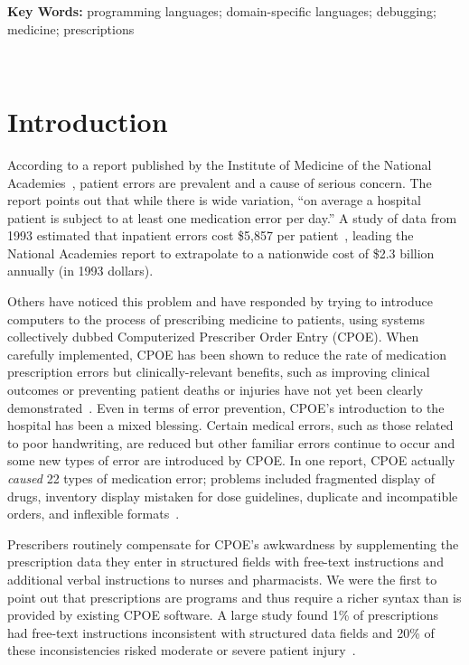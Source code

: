\documentclass[11pt]{article}
\begin{document}
\noindent
\textbf{Key Words:} programming languages; domain-specific languages; debugging; medicine; prescriptions

\newpage

\setlength{\parindent}{0pt}
\setlength{\parskip}{1ex plus 0.5ex minus 0.2ex}

\setcounter{page}{1}
\pagestyle{plain}


~

\section{Introduction}

According to a report published by the Institute of Medicine of the
National Academies~\citep{preventing-medical-errors}, patient errors
are prevalent and a cause of serious concern.
%
The report points out that while there is wide variation, ``on average
a hospital patient is subject to at least one medication error per
day.''
%
A study of data from 1993 estimated that inpatient errors cost \$5,857
per patient~\citep{bates-et-al-1997}, leading the National Academies
report to extrapolate to a nationwide cost of \$2.3 billion annually
(in 1993 dollars).

Others have noticed this problem and have responded by trying to
introduce computers to the process of prescribing medicine to
patients, using systems collectively dubbed Computerized Prescriber
Order Entry (CPOE).
%
When carefully implemented, CPOE has been shown to reduce the rate of
medication prescription errors but clinically-relevant benefits, such
as improving clinical outcomes or preventing patient deaths or
injuries have not yet been clearly demonstrated~\citep{vanRosse2009}.
%
Even in terms of error prevention, CPOE's introduction to the hospital
has been a mixed blessing.
%
Certain medical errors, such as those related to poor handwriting, are
reduced but other familiar errors continue to occur and some new types
of error are introduced by CPOE.
%
In one report, CPOE actually \emph{caused} 22 types of medication
error; problems included fragmented display of drugs, inventory
display mistaken for dose guidelines, duplicate and incompatible
orders, and inflexible formats~\citep{Koppel2005}.

Prescribers routinely compensate for CPOE's awkwardness by supplementing the prescription data they enter in structured fields with free-text instructions and additional verbal instructions to nurses and pharmacists. We were the first to point out that prescriptions are programs and thus require a richer syntax than is provided by existing CPOE software.
%
A large study found 1\% of prescriptions had free-text instructions
inconsistent with structured data fields and 20\% of these
inconsistencies risked moderate or severe patient
injury~\citep{Singh2009}.
\end{document}
